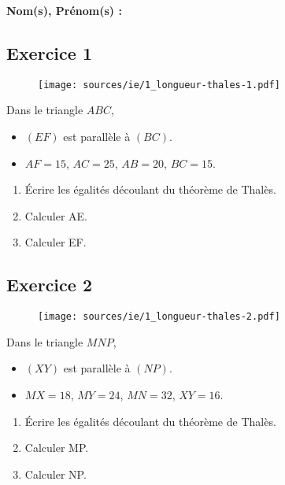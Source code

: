 \documentclass[12pt]{article}
\begin{document}
\noindent\hrulefill

\textbf{Nom(s), Prénom(s) :}

\subsection*{Exercice 1}

\begin{multicols}{2}

  \begin{figure}[H]
    \centering
    \texttt{[image: sources/ie/1\_longueur-thales-1.pdf]}
  \end{figure}

  Dans le triangle $ABC$, 

  \begin{itemize}
  \item $(EF)$ est parallèle à $(BC)$.
  \item $AF = 15$, $AC = 25$, $AB = 20$, $BC = 15$.
  \end{itemize}

  \begin{enumerate}
  \item Écrire les égalités découlant du théorème de Thalès.
  \item Calculer AE.
  \item Calculer EF.
  \end{enumerate}

\end{multicols}
\subsection*{Exercice 2}

\begin{multicols}{2}

  \begin{figure}[H]
    \centering
    \texttt{[image: sources/ie/1\_longueur-thales-2.pdf]}
  \end{figure}

  Dans le triangle $MNP$, 

  \begin{itemize}
  \item $(XY)$ est parallèle à $(NP)$.
  \item $MX = 18$, $MY = 24$, $MN = 32$, $XY = 16$.
  \end{itemize}

  \begin{enumerate}
  \item Écrire les égalités découlant du théorème de Thalès.
  \item Calculer MP.
  \item Calculer NP.
  \end{enumerate}

\end{multicols}
\end{document}
